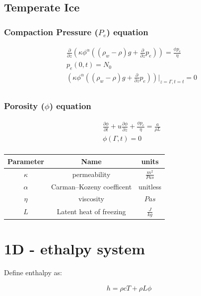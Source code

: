 \documentclass[a4paper,12pt]{article}
\newcommand{\pd}[2]{\frac{\partial #1}{\partial #2}}
\begin{document}
\subsection{Temperate Ice}

\subsubsection{Compaction Pressure ($P_e$) equation}

\begin{align*}
  &\pd{}{z}\left(\kappa\phi^\alpha\left((\rho_w - \rho)g + \pd{}{z}p_e\right)\right) = \frac{\phi p_e}{\eta}\\
  &p_e(0,t) = N_0\\
  &\left(\kappa \phi^\alpha\left( (\rho_w - \rho)g + \pd{}{z} p_e\right)\right)\bigg\rvert_{z=\Gamma, t=t} = 0\\
\end{align*}

\subsubsection{Porosity ($\phi$) equation}

\begin{align*}
  &\pd{\phi}{t} + u\pd{\phi}{z} + \frac{\phi p_e}{\eta} = \frac{a}{\rho L}\\
  &\phi(\Gamma, t) = 0\\
\end{align*}


\begin{center}
\begin{tabular}{ |c|c|c| } 
 \hline
  Parameter & Name & units\\
  \hline
  $\kappa$ & permeability & $\frac{m^2}{Pa s}$\\
  $\alpha$ & Carman–Kozeny coefficent & unitless\\
  $\eta$ & viscosity & $Pa s$\\
  $L$ & Latent heat of freezing & $\frac{J}{kg}$\\
  \hline
\end{tabular}
\end{center}

\section{1D - ethalpy system}

Define enthalpy as:

\begin{align*}
  h = \rho c T + \rho L \phi
\end{align*}
\end{document}
